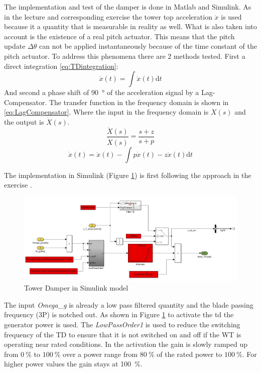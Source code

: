 The implementation and test of the damper is done in Matlab and Simulink.
As in the lecture \cite{SchlipfLecture} and corresponding exercise the tower top acceleration $\ddot{x}$ is used because it a quantity that is measurable in reality as well.
What is also taken into account is the existence of a real pitch actuator. This means that the pitch update $\Delta\theta$ can not be applied instantaneously because of the time constant of the pitch actuator.
To address this phenomena there are 2 methods tested. 
First a direct integration \ref{eq:TDintegration}: 
\begin{equation}
	\dot{x}(t) = \int\ddot{x}(t) \text{d}t
	\label{eq:TDintegration}
\end{equation} 
And second a phase shift of \SI{90}{\degree} of the acceleration signal by a Lag-Compensator. The transfer function in the frequency domain is shown in \ref{eq:LagCompensator}. Where the input in the frequency domain is $\ddot{X}(s)$ and the output is $\dot{X}(s)$. 
\begin{equation}
	\frac{\ddot{X}(s)}{\dot{X}(s)} = \frac{s + z}{s + p}
	\label{eq:LagCompensator}
\end{equation} 
\begin{equation}
	\dot{x}(t) = \ddot{x}(t) - \int p\dot{x}(t) - z\ddot{x}(t) \text{d}t
	\label{eq:xddTimeDomain}
\end{equation} 


The implementation in Simulink (Figure \ref{fig:TDoverview}) is first following the approach in the exercise \cite{SchlipfLecture}.

\begin{figure}[tbh]
	\centering	
	\includegraphics[width=12cm]{Figures/TDoverview}
	\caption{Tower Damper in Simulink model}
	\label{fig:TDoverview}
\end{figure} 

The input \textit{Omega\_g} is already a low pass filtered quantity and the blade passing frequency (3P) is notched out. As shown in Figure \ref{fig:TDoverview} to activate the \gls{td} the generator power is used. The \textit{LowPassOrder1} is used to reduce the switching frequency of the TD to ensure that it is not switched on and off if the \gls{WT} is operating near rated conditions. In the activation the gain is slowly ramped up from $\SI{0}{\%}$ to $\SI{100}{\%}$ over a power range from $\SI{80}{\%}$ of the rated power to $\SI{100}{\%}$.
For higher power values the gain stays at \SI{100}{\%}.

